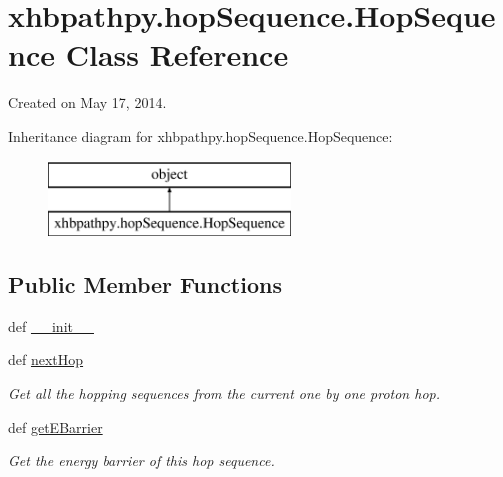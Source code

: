 \hypertarget{classxhbpathpy_1_1hop_sequence_1_1_hop_sequence}{\section{xhbpathpy.\-hop\-Sequence.\-Hop\-Sequence Class Reference}
\label{classxhbpathpy_1_1hop_sequence_1_1_hop_sequence}
}


Created on May 17, 2014.  


Inheritance diagram for xhbpathpy.\-hop\-Sequence.\-Hop\-Sequence\-:\begin{figure}[H]
\begin{center}
\leavevmode
\includegraphics[height=2.000000cm]{classxhbpathpy_1_1hop_sequence_1_1_hop_sequence}
\end{center}
\end{figure}
\subsection*{Public Member Functions}
\begin{DoxyCompactItemize}
\item 
def \hyperlink{classxhbpathpy_1_1hop_sequence_1_1_hop_sequence_adc84862973bac63a8e5f500898de55c3}{\-\_\-\-\_\-init\-\_\-\-\_\-}
\item 
def \hyperlink{classxhbpathpy_1_1hop_sequence_1_1_hop_sequence_ad8e8fd6c422af62fa439fd4a9400acc4}{next\-Hop}
\begin{DoxyCompactList}\small\item\em Get all the hopping sequences from the current one by one proton hop. \end{DoxyCompactList}\item 
def \hyperlink{classxhbpathpy_1_1hop_sequence_1_1_hop_sequence_ad564ff72590f7a78c7ffc3a812dbf938}{get\-E\-Barrier}
\begin{DoxyCompactList}\small\item\em Get the energy barrier of this hop sequence. \end{DoxyCompactList}\end{DoxyCompactItemize}
